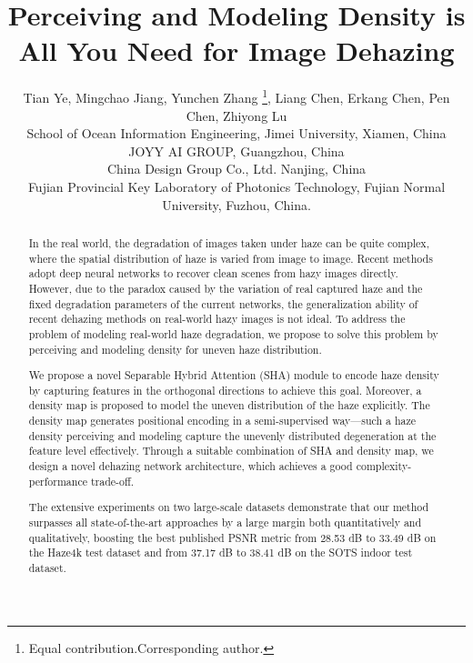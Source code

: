 \documentclass[final]{cvpr}
\begin{document}
\title{Perceiving and Modeling Density is All You Need for Image Dehazing}

\author{
    Tian Ye,
    Mingchao Jiang,
    Yunchen Zhang \thanks{Equal contribution.Corresponding author.},
    Liang Chen,
    Erkang Chen,
    Pen Chen,
    Zhiyong Lu
    \\
    School of Ocean Information Engineering,
    Jimei University, Xiamen, China\\
    JOYY AI GROUP,
    Guangzhou, China\\
    China Design Group Co., Ltd.
    Nanjing, China\\
    Fujian Provincial Key Laboratory of Photonics Technology, Fujian Normal University, Fuzhou, China. \\
    
   
}

\maketitle
\begin{abstract}
In the real world, the degradation of images taken under haze can be quite complex, where the spatial distribution of haze is varied from image to image. Recent methods adopt deep neural networks to recover clean scenes from hazy images directly. However, due to the paradox caused by the variation of real captured haze and the fixed degradation parameters of the current networks, the generalization 
ability of recent dehazing methods on real-world hazy images is not ideal. 
To address the problem of modeling real-world haze degradation, we propose to solve this problem by perceiving and modeling density for uneven haze distribution.

We propose a novel Separable Hybrid Attention (SHA) module to encode haze density by capturing features in the orthogonal directions to achieve this goal. 
Moreover, a density map is proposed to model the uneven distribution of the haze explicitly. The density map generates positional encoding in a semi-supervised way—such a haze density perceiving and modeling capture the unevenly distributed degeneration at the feature level effectively. Through a suitable combination of SHA and density map, we design a novel dehazing network architecture, which achieves a good complexity-performance trade-off.

The extensive experiments on two large-scale datasets demonstrate that our method surpasses all state-of-the-art approaches by a large margin both quantitatively and qualitatively, boosting the best published PSNR metric from 28.53 dB to 33.49 dB on the Haze4k test dataset and from 37.17 dB to 38.41 dB on the SOTS indoor test dataset.
\end{abstract}
\end{document}
